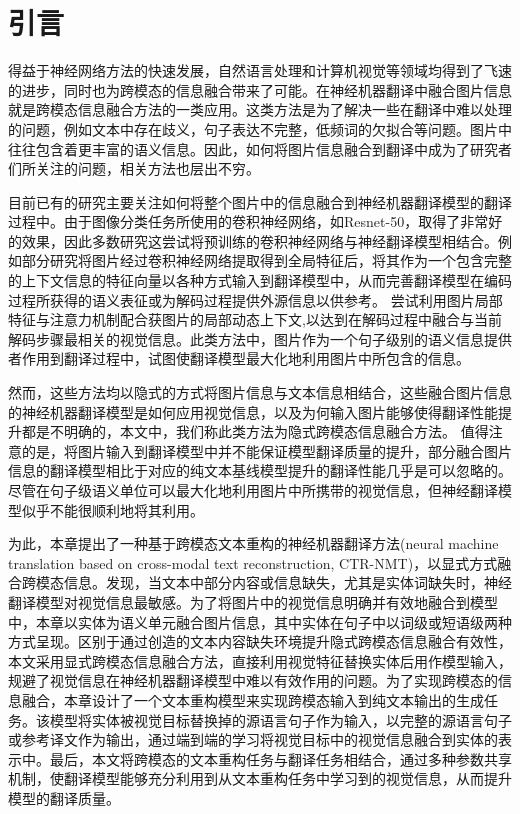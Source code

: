 \section{引言}
得益于神经网络方法的快速发展，自然语言处理和计算机视觉等领域均得到了飞速的进步，同时也为跨模态的信息融合带来了可能。在神经机器翻译中融合图片信息就是跨模态信息融合方法的一类应用。这类方法是为了解决一些在翻译中难以处理的问题，例如文本中存在歧义，句子表达不完整，低频词的欠拟合等问题。图片中往往包含着更丰富的语义信息。因此，如何将图片信息融合到翻译中成为了研究者们所关注的问题，相关方法也层出不穷。

目前已有的研究主要关注如何将整个图片中的信息融合到神经机器翻译模型的翻译过程中。由于图像分类任务所使用的卷积神经网络，如Resnet-50，取得了非常好的效果，因此多数研究这尝试将预训练的卷积神经网络与神经翻译模型相结合。例如部分研究将图片经过卷积神经网络提取得到全局特征后，将其作为一个包含完整的上下文信息的特征向量以各种方式输入到翻译模型中，从而完善翻译模型在编码过程所获得的语义表征或为解码过程提供外源信息以供参考。
尝试利用图片局部特征与注意力机制配合获图片的局部动态上下文,以达到在解码过程中融合与当前解码步骤最相关的视觉信息。此类方法中，图片作为一个句子级别的语义信息提供者作用到翻译过程中，试图使翻译模型最大化地利用图片中所包含的信息。

然而，这些方法均以隐式的方式将图片信息与文本信息相结合，这些融合图片信息的神经机器翻译模型是如何应用视觉信息，以及为何输入图片能够使得翻译性能提升都是不明确的，本文中，我们称此类方法为隐式跨模态信息融合方法。
值得注意的是，将图片输入到翻译模型中并不能保证模型翻译质量的提升，部分融合图片信息的翻译模型相比于对应的纯文本基线模型提升的翻译性能几乎是可以忽略的。
尽管在句子级语义单位可以最大化地利用图片中所携带的视觉信息，但神经翻译模型似乎不能很顺利地将其利用。

为此，本章提出了一种基于跨模态文本重构的神经机器翻译方法(neural machine translation based on cross-modal text reconstruction, CTR-NMT)，以显式方式融合跨模态信息。发现，当文本中部分内容或信息缺失，尤其是实体词缺失时，神经翻译模型对视觉信息最敏感。为了将图片中的视觉信息明确并有效地融合到模型中，本章以实体为语义单元融合图片信息，其中实体在句子中以词级或短语级两种方式呈现。区别于通过创造的文本内容缺失环境提升隐式跨模态信息融合有效性，本文采用显式跨模态信息融合方法，直接利用视觉特征替换实体后用作模型输入，规避了视觉信息在神经机器翻译模型中难以有效作用的问题。为了实现跨模态的信息融合，本章设计了一个文本重构模型来实现跨模态输入到纯文本输出的生成任务。该模型将实体被视觉目标替换掉的源语言句子作为输入，以完整的源语言句子或参考译文作为输出，通过端到端的学习将视觉目标中的视觉信息融合到实体的表示中。最后，本文将跨模态的文本重构任务与翻译任务相结合，通过多种参数共享机制，使翻译模型能够充分利用到从文本重构任务中学习到的视觉信息，从而提升模型的翻译质量。


